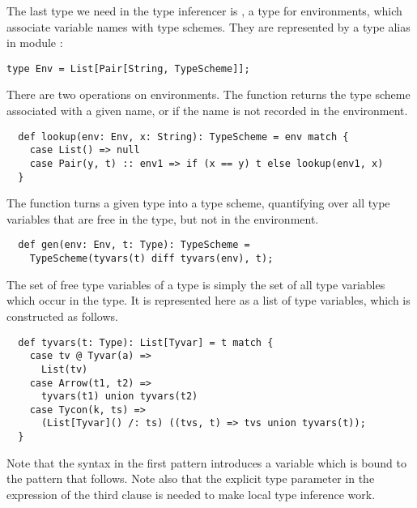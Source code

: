 {The last type we need in the type inferencer is
, a type for environments, which associate variable names
with type schemes. They are represented by a type alias  in
module :
\begin{lstlisting}
type Env = List[Pair[String, TypeScheme]];
\end{lstlisting}
There are two operations on environments. The  function
returns the type scheme associated with a given name, or 
if the name is not recorded in the environment.
\begin{lstlisting}
  def lookup(env: Env, x: String): TypeScheme = env match {
    case List() => null
    case Pair(y, t) :: env1 => if (x == y) t else lookup(env1, x)
  }
\end{lstlisting}
The  function turns a given type into a type scheme,
quantifying over all type variables that are free in the type, but
not in the environment.
\begin{lstlisting}
  def gen(env: Env, t: Type): TypeScheme = 
    TypeScheme(tyvars(t) diff tyvars(env), t);
\end{lstlisting}
The set of free type variables of a type is simply the set of all type
variables which occur in the type. It is represented here as a list of
type variables, which is constructed as follows.
\begin{lstlisting}
  def tyvars(t: Type): List[Tyvar] = t match {
    case tv @ Tyvar(a) => 
      List(tv)
    case Arrow(t1, t2) => 
      tyvars(t1) union tyvars(t2)
    case Tycon(k, ts) => 
      (List[Tyvar]() /: ts) ((tvs, t) => tvs union tyvars(t));
  }
\end{lstlisting}
Note that the syntax  in the first pattern introduces a variable
which is bound to the pattern that follows. Note also that the explicit type parameter \code{[Tyvar]} in the expression of the third
clause is needed to make local type inference work.

}
